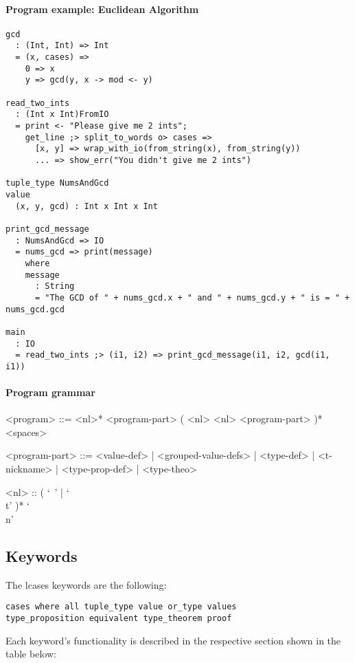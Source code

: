 \documentclass{article}
\begin{document}
\paragraph{Program example: Euclidean Algorithm}
\begin{verbatim}
gcd
  : (Int, Int) => Int
  = (x, cases) =>
    0 => x
    y => gcd(y, x -> mod <- y) 

read_two_ints
  : (Int x Int)FromIO
  = print <- "Please give me 2 ints";
    get_line ;> split_to_words o> cases =>
      [x, y] => wrap_with_io(from_string(x), from_string(y))
      ... => show_err("You didn't give me 2 ints")
 
tuple_type NumsAndGcd
value
  (x, y, gcd) : Int x Int x Int

print_gcd_message
  : NumsAndGcd => IO
  = nums_gcd => print(message)
    where
    message
      : String
      = "The GCD of " + nums_gcd.x + " and " + nums_gcd.y + " is = " + nums_gcd.gcd

main
  : IO
  = read_two_ints ;> (i1, i2) => print_gcd_message(i1, i2, gcd(i1, i1))
\end{verbatim}

\paragraph{Program grammar}
\begin{grammar}
<program> ::=
<nl>* <program-part> ( <nl> <nl> <program-part> )* <spaces>

<program-part> ::=
<value-def> | <grouped-value-defs> | <type-def> | <t-nickname> | <type-prop-def> |
<type-theo>

<nl> :: ( `\ ' | `\\t' )* `\\n'
\end{grammar}

\subsection{Keywords}

The lcases keywords are the following:
\begin{verbatim}
cases where all tuple_type value or_type values
type_proposition equivalent type_theorem proof
\end{verbatim}
Each keyword's functionality is described in the respective section shown in the 
table below:
\end{document}

